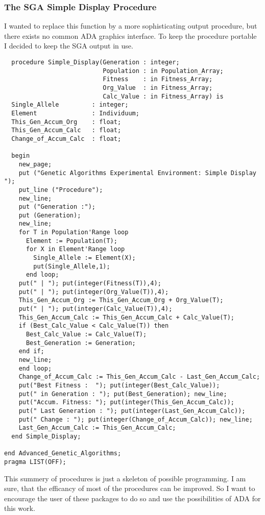 \subsubsection{The SGA Simple Display Procedure}
I wanted to replace this function by a more sophisticating output procedure, but
there exists no common ADA graphics interface. To keep the procedure portable
I decided to keep the SGA output in use.
\begin{verbatim}
  procedure Simple_Display(Generation : integer;
                           Population : in Population_Array;
                           Fitness    : in Fitness_Array;
                           Org_Value  : in Fitness_Array;
                           Calc_Value : in Fitness_Array) is
  Single_Allele         : integer;
  Element               : Individuum;
  This_Gen_Accum_Org    : float;
  This_Gen_Accum_Calc   : float;
  Change_of_Accum_Calc  : float;
  
  begin
    new_page;
    put ("Genetic Algorithms Experimental Environment: Simple Display ");
    put_line ("Procedure");
    new_line;
    put ("Generation :");
    put (Generation);
    new_line;
    for T in Population'Range loop
      Element := Population(T);
      for X in Element'Range loop
        Single_Allele := Element(X);
        put(Single_Allele,1);
      end loop;
    put(" | "); put(integer(Fitness(T)),4);
    put(" | "); put(integer(Org_Value(T)),4);
    This_Gen_Accum_Org := This_Gen_Accum_Org + Org_Value(T);
    put(" | "); put(integer(Calc_Value(T)),4);
    This_Gen_Accum_Calc := This_Gen_Accum_Calc + Calc_Value(T);
    if (Best_Calc_Value < Calc_Value(T)) then
      Best_Calc_Value := Calc_Value(T);
      Best_Generation := Generation;
    end if;
    new_line;
    end loop;
    Change_of_Accum_Calc := This_Gen_Accum_Calc - Last_Gen_Accum_Calc;
    put("Best Fitness :  "); put(integer(Best_Calc_Value));
    put(" in Generation : "); put(Best_Generation); new_line;
    put("Accum. Fitness: "); put(integer(This_Gen_Accum_Calc));
    put(" Last Generation : "); put(integer(Last_Gen_Accum_Calc));
    put(" Change : "); put(integer(Change_of_Accum_Calc)); new_line;
    Last_Gen_Accum_Calc := This_Gen_Accum_Calc;
  end Simple_Display;
  
end Advanced_Genetic_Algorithms;
pragma LIST(OFF);
\end{verbatim}
This summery of procedures is just a skeleton of possible programming. I am sure, that the
efficancy of most of the procedures can be improved. So I want to encourage
the user of these packages to do so and use the possibilities of ADA for this
work.
